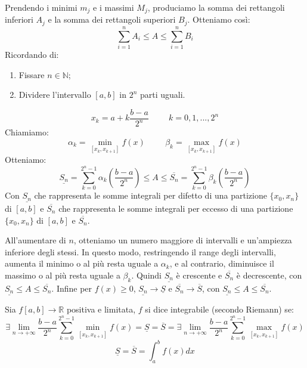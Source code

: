 Prendendo i minimi $m_j$ e i massimi $M_j$, produciamo la somma dei rettangoli inferiori $A_j$ e la somma dei rettangoli superiori $B_j$. Otteniamo così:
\begin{equation*}
    \sum^n_{i=1}A_i\leq A\leq \sum^n_{i=1}B_i
\end{equation*}
Ricordando di:
\begin{enumerate}
    \item Fissare $n\in\mathbb{N}$;
    \item Dividere l'intervallo $[a,b]$ in $2^n$ parti uguali.
\end{enumerate}
\begin{equation*}
    x_k=a+k\frac{b-a}{2^n}\hspace{1cm}k=0,1,...,2^n
\end{equation*}
Chiamiamo:
\begin{equation*}
    \alpha_k=\min_{[x_k,x_{k+1}]}f(x)\hspace{1cm}\beta_k=\max_{[x_k,x_{k+1}]}f(x)
\end{equation*}
Otteniamo:
\begin{equation*}
    \underline{S_n}=\sum^{2^n-1}_{k=0}\alpha_k(\frac{b-a}{2^n})\leq A \leq \overline{S_n}=\sum^{2^n-1}_{k=0}\beta_k(\frac{b-a}{2^n})
\end{equation*}
Con $\underline{S_n}$ che rappresenta le somme integrali per difetto di una partizione $\{x_0, x_n\}$ di $[a,b]$ e $\overline{S_n}$ che rappresenta le somme integrali per eccesso di una partizione $\{x_0, x_n\}$ di $[a,b]$ e $\overline{S_n}$.

All'aumentare di $n$, otteniamo un numero maggiore di intervalli e un'ampiezza inferiore degli stessi. In questo modo, restringendo il range degli intervalli, aumenta il minimo o al più resta uguale a $\alpha_k$, e al contrario, diminuisce il massimo o al più resta uguale a $\beta_k$.
Quindi $\underline{S_n}$ è crescente e $\overline{S_n}$ è decrescente, con $\underline{S_n}\leq A\leq \overline{S_n}$.
Infine per $f(x)\geq0$, $\underline{S_n}\to\underline{S}$ e $\overline{S_n}\to\overline{S}$, con $\underline{S_n}\leq A\leq \overline{S_n}$.

\begin{definition*}[Integrale]
    Sia $f[a,b]\to\mathbb{R}$ positiva e limitata, $f$ si dice integrabile (secondo Riemann) se:
    \begin{equation*}
        \exists\lim_{n\to+\infty}\frac{b-a}{2^n}\sum^{2^n-1}_{k=0}\min_{[x_k, x_{k+1}]}f(x)=\underline{S}=\overline{S}=\exists\lim_{n\to+\infty}\frac{b-a}{2^n}\sum^{2^n-1}_{k=0}\max_{[x_k, x_{k+1}]}f(x)
    \end{equation*}
    \begin{equation*}
        \underline{S}=\overline{S}=\int_a^bf(x)dx
    \end{equation*}
\end{definition*}

